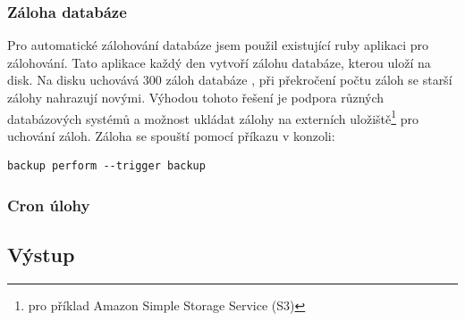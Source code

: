 \subsubsection{Záloha databáze}
Pro automatické zálohování databáze jsem použil existující ruby aplikaci pro zálohování. Tato aplikace každý den vytvoří zálohu databáze, kterou uloží na disk. Na disku uchovává 300 záloh databáze , při překročení počtu záloh se starší zálohy nahrazují novými. Výhodou tohoto řešení je podpora různých databázových systémů a možnost ukládat zálohy na externích uložiště\footnote{pro příklad Amazon Simple Storage Service (S3)} pro uchování záloh. Záloha se spouští pomocí příkazu v konzoli:
\begin{verbatim}
backup perform --trigger backup
\end{verbatim} 

\subsubsection{Cron úlohy}


\subsection{Výstup} 

